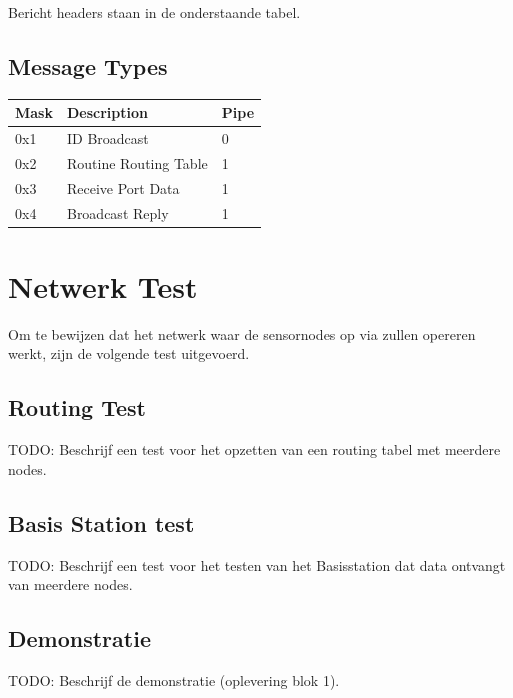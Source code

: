 \documentclass[a4paper, 11pt]{article}
\begin{document}
Bericht headers staan in de onderstaande tabel.

\subsection*{Message Types}
\begin{table}[!ht]
\begin{tabular}{|l|l|l|}
\hline
\rowcolor[HTML]{EFEFEF} 
Mask & Description           & Pipe \\ \hline
0x1  & ID Broadcast          & 0    \\ \hline
0x2  & Routine Routing Table & 1    \\ \hline
0x3  & Receive Port Data     & 1    \\ \hline
0x4  & Broadcast Reply       & 1    \\ \hline
\end{tabular}
\end{table}

\section{Netwerk Test}
Om te bewijzen dat het netwerk waar de sensornodes op via zullen opereren werkt, zijn de volgende test uitgevoerd. 
\subsection{Routing Test}
TODO: Beschrijf een test voor het opzetten van een routing tabel met meerdere nodes.
\subsection{Basis Station test}
TODO: Beschrijf een test voor het testen van het Basisstation dat data ontvangt van meerdere nodes. 
\subsection{Demonstratie}
TODO: Beschrijf de demonstratie (oplevering blok 1).

\newpage
\end{document}
